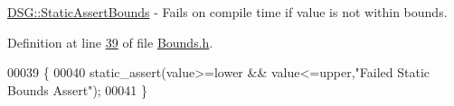 \hyperlink{namespace_d_s_g_a3fa12557d889e704f2e33d88929ec67a}{D\+S\+G\+::\+Static\+Assert\+Bounds} -\/ Fails on compile time if value is not within bounds. 



Definition at line \hyperlink{_bounds_8h_source_l00039}{39} of file \hyperlink{_bounds_8h_source}{Bounds.\+h}.


\begin{DoxyCode}
00039                              \{
00040         static\_assert(value>=lower && value<=upper,\textcolor{stringliteral}{"Failed Static Bounds Assert"});
00041     \}
\end{DoxyCode}
